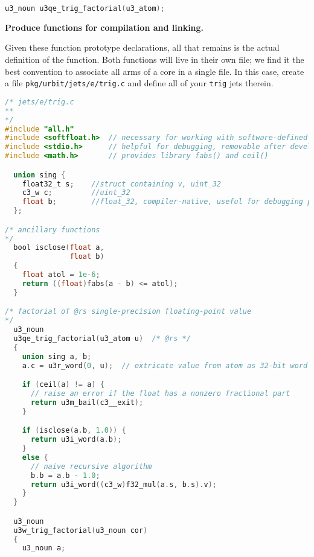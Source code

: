 \begin{example}
\begin{lstlisting}[language=C,
                   caption={Additions to \texttt{pkg/urbit/include/q.h}}]
u3_noun u3qe_trig_factorial(u3_atom);
\end{lstlisting}

\textbf{Produce functions for compilation and linking.}

Given these function prototype declarations, all that remains is the actual definition of the function.  Both functions will live in their own file; we find it the best convention to associate all arms of a core in a single file.  In this case, create a file \texttt{pkg/urbit/jets/e/trig.c} and define all of your \texttt{trig} jets therein.

\begin{lstlisting}[language=C,
                   caption={\texttt{pkg/urbit/jets/e/trig.c}}]
/* jets/e/trig.c
**
*/
#include "all.h"
#include <softfloat.h>  // necessary for working with software-defined floats
#include <stdio.h>      // helpful for debugging, removable after development
#include <math.h>       // provides library fabs() and ceil()

  union sing {
    float32_t s;    //struct containing v, uint_32
    c3_w c;         //uint_32
    float b;        //float_32, compiler-native, useful for debugging printfs
  };

/* ancillary functions
*/
  bool isclose(float a,
               float b)
  {
    float atol = 1e-6;
    return ((float)fabs(a - b) <= atol);
  }

/* factorial of @rs single-precision floating-point value
*/
  u3_noun
  u3qe_trig_factorial(u3_atom u)  /* @rs */
  {
    union sing a, b;
    a.c = u3r_word(0, u);  // extricate value from atom as 32-bit word

    if (ceil(a) != a) {
      // raise an error if the float has a nonzero fractional part
      return u3m_bail(c3__exit);
    }

    if (isclose(a.b, 1.0)) {
      return u3i_word(a.b);
    }
    else {
      // naive recursive algorithm
      b.b = a.b - 1.0;
      return u3i_word((c3_w)f32_mul(a.s, b.s).v);
    }
  }

  u3_noun
  u3w_trig_factorial(u3_noun cor)
  {
    u3_noun a;


\end{lstlisting}
\end{example}
